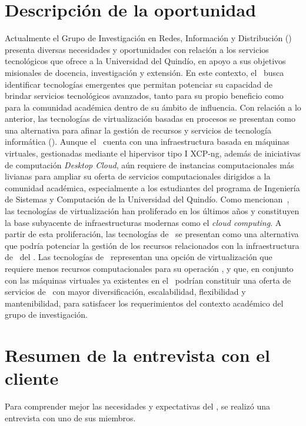 \section{Descripción de la oportunidad}
\noindent
Actualmente el Grupo de Investigación en Redes, Información y Distribución (\GRID) presenta diversas necesidades y oportunidades con relación a los servicios tecnológicos que ofrece a la Universidad del Quindío, en apoyo a sus objetivos misionales de docencia, investigación y extensión.
En este contexto, el \GRID\ busca identificar tecnologías emergentes que permitan potenciar su capacidad de brindar servicios tecnológicos avanzados, tanto para su propio beneficio como para la comunidad académica dentro de su ámbito de influencia.
Con relación a lo anterior, las tecnologías de virtualización basadas en procesos se presentan como una alternativa para afinar la gestión de recursos y servicios de tecnología informática (\TI). Aunque el \GRID\ cuenta con una infraestructura basada en máquinas virtuales, gestionadas mediante el hipervisor tipo I XCP-ng, además de iniciativas de computación \textit{Desktop Cloud}, aún requiere de instancias computacionales más livianas para ampliar su oferta de servicios computacionales dirigidos a la comunidad académica, especialmente a los estudiantes del programa de Ingeniería de Sistemas y Computación de la Universidad del Quindío.
Como mencionan~\citep{Sepulveda-Rodriguez2022}, las tecnologías de virtualización han proliferado en los últimos años y constituyen la base subyacente de infraestructuras modernas como el \textit{cloud computing}. A partir de esta proliferación, las tecnologías de \VBC\ se presentan como una alternativa que podría potenciar la gestión de los recursos relacionados con la infraestructura de \TI\ del \GRID.
Las tecnologías de \VBC\ representan una opción de virtualización que requiere menos recursos computacionales para su operación \citep{Xavier2013}, y que, en conjunto con las máquinas virtuales ya existentes en el \GRID\, podrían constituir una oferta de servicios de \TI\ con mayor diversificación, escalabilidad, flexibilidad y mantenibilidad, para satisfacer los requerimientos del contexto académico del grupo de investigación.

\section{Resumen de la entrevista con el cliente}\label{sec:entrevista-cliente}
\noindent
Para comprender mejor las necesidades y expectativas del \GRID, se realizó una entrevista con uno de sus miembros.

